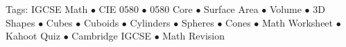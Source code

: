 \documentclass[11pt,a4paper]{article}
\begin{document}
\vspace{14pt}
\begin{center}
  \sffamily\scriptsize\textcolor{textmuted}{
    Tags: IGCSE Math $\bullet$ CIE 0580 $\bullet$ 0580 Core $\bullet$ Surface Area $\bullet$ Volume $\bullet$ 3D Shapes $\bullet$ Cubes $\bullet$ Cuboids $\bullet$ Cylinders $\bullet$ Spheres $\bullet$ Cones $\bullet$ Math Worksheet $\bullet$ Kahoot Quiz $\bullet$ Cambridge IGCSE $\bullet$ Math Revision
  }
\end{center}
\end{document}
